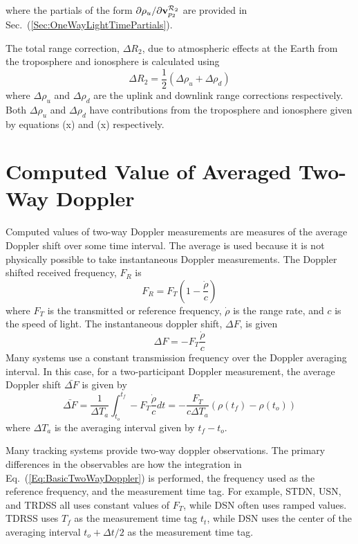 %
where the partials of the form $\partial \rho_{u} / \partial \mathbf{v}^{\mcR_2}_{p_2}$ are provided in Sec.~(\ref{Sec:OneWayLightTimePartials}).

The total range correction, $\Delta R_2$, due to atmospheric effects at the Earth from the troposphere and ionosphere is calculated using
%
\begin{equation}
    \Delta R_2 = \frac{1}{2} \left( \Delta \rho_u + \Delta \rho_d \right)
\end{equation}
%
where $\Delta \rho_u$ and $\Delta \rho_d$  are the uplink and downlink range corrections respectively.  Both $\Delta \rho_u$ and $\Delta \rho_d$ have contributions from the troposphere and ionosphere given by equations (x) and (x) respectively.

\section{Computed Value of Averaged Two-Way Doppler }

Computed values of two-way Doppler measurements are measures of the average Doppler shift over some time interval.   The average is used because it is not physically possible to take instantaneous Doppler measurements.  The Doppler shifted received frequency, $F_R$ is 
%
\begin{equation}
   F_R =  F_T\left( 1 -  \frac{\dot{\rho}}{c}\right)
\end{equation}
%
where $F_T$ is the transmitted or reference frequency, $\dot{\rho}$ is the range rate, and $c$ is the speed of light.
The instantaneous doppler shift, $\Delta F$, is given
%
\begin{equation}
   \Delta F =  -F_T \frac{\dot{\rho}}{c}
\end{equation}
%
Many systems use a constant transmission frequency over the Doppler averaging interval.  In this case, for a two-participant Doppler measurement, the average Doppler shift $\bar{\Delta F}$ is given by
%
\begin{equation}
     \bar{\Delta F} = \frac{1}{\Delta T_a}\int_{t_o}^{t_f} -F_T \frac{\dot{\rho}}{c} dt = -\frac{F_T}{c \Delta T_a}\left(\rho(t_f) - \rho(t_o)\right) \label{Eq:BasicTwoWayDoppler}
\end{equation}
%
where $\Delta T_a$ is the averaging interval given by $t_f - t_o$. 
 
Many tracking systems provide two-way doppler observations.  The primary differences in the observables are how the integration  in Eq.~(\ref{Eq:BasicTwoWayDoppler}) is performed, the frequency used as the reference frequency, and the measurement time tag.   For example, STDN, USN, and TRDSS all uses constant values of $F_T$, while DSN often uses ramped values.  TDRSS uses $T_f$ as the measurement time tag $t_t$, while DSN uses the center of the averaging interval $t_o + \Delta t/2$ as the measurement time tag.

